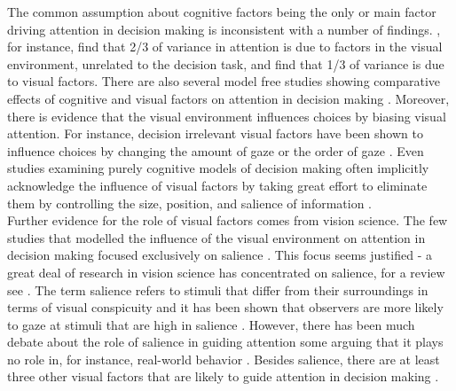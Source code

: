 \documentclass[english,natbib,man,floatsintext]{apa6}
\begin{document}

The common assumption about cognitive factors being the only or main factor driving attention in decision making is inconsistent with a number of findings. \cite{vanderlans2008}, for instance, find that 2/3 of variance in attention is due to factors in the visual environment, unrelated to the decision task, and \cite{towal2013a} find that 1/3 of variance is due to visual factors. There are also several model free studies showing comparative effects of cognitive and visual factors on attention in decision making \citep{gidloef2017a, orquin2015a, orquin2019a}. Moreover, there is evidence that the visual environment influences choices by biasing visual attention. For instance, decision irrelevant visual factors have been shown to influence choices by changing the amount of gaze \citep{peschel2019, chandon2009a} or the order of gaze \citep{reeck2017a}. Even studies examining purely cognitive models of decision making often implicitly acknowledge the influence of visual factors by taking great effort to eliminate them by controlling the size, position, and salience of information \citep{brandstatter2014, gloeckner2011a, perkovic2018}.\\

Further evidence for the role of visual factors comes from vision science. The few studies that modelled the influence of the visual environment on attention in decision making focused exclusively on salience \citep{chen2013,navalpakkam2010, towal2013a}. This focus seems justified - a great deal of research in vision science has concentrated on salience, for a review see \cite{borji2012a}. The term salience refers to stimuli that differ from their surroundings in terms of visual conspicuity and it has been shown that observers are more likely to gaze at stimuli that are high in salience \cite{itti2000}. However, there has been much debate about the role of salience in guiding attention some arguing that it plays no role in, for instance, real-world behavior \citep{tatler2011a}. Besides salience, there are at least three other visual factors that are likely to guide attention in decision making \citep{orquin2013a, wedel2008}.\\
\end{document}
